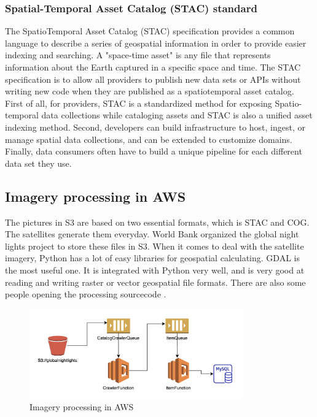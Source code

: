 \documentclass[conference]{IEEEtran}
\begin{document}
	\subsubsection{Spatial-Temporal Asset Catalog (STAC) standard}
	
	The SpatioTemporal Asset Catalog (STAC) specification provides a common language to describe a series of geospatial 
	information in order to provide easier indexing and searching. A "space-time asset" is any file that represents information 
	about the Earth captured in a specific space and time. The STAC specification is to allow all providers to publish new data 
	sets or APIs without writing new code when they are published as a spatiotemporal asset catalog\cite{SpatioTe88:online}. 
	First of all, for providers, STAC is a standardized method for exposing Spatio-temporal data collections while cataloging 
	assets and STAC is also a unified asset indexing method. Second, developers can build infrastructure to host, ingest, or 
	manage spatial data collections, and can be extended to customize domains. Finally, data consumers often have to build a 
	unique pipeline for each different data set they use.


\subsection{Imagery processing in AWS}

The pictures in S3 are based on two essential formats, which is STAC and COG. The satellites generate them everyday. 
World Bank organized the global night lights project to store these files in S3. When it comes to deal with the satellite 
imagery, Python has a lot of easy libraries for geospatial calculating. GDAL is the most useful one. 
It is integrated with Python very well, and is very good at reading and writing raster or vector geospatial file formats.
There are also some people opening the processing sourcecode \cite{Howtopro5:online}.


\begin{figure}[htbp]
    \centerline{\includegraphics[width=260pt]{images/dataprocess.png}}
    \caption{Imagery processing in AWS}
    \label{fig4}
\end{figure}
\end{document}
